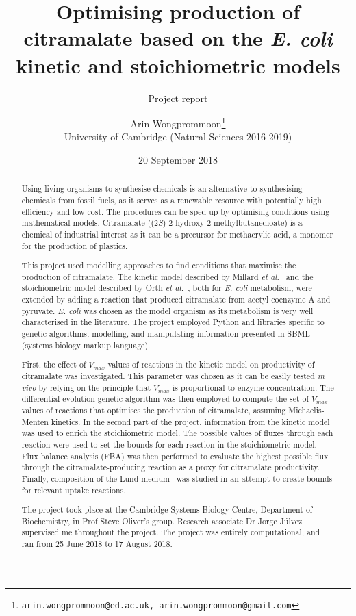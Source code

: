 \documentclass[parskip=full, numbers=noenddot]{scrreprt}
\author{Arin Wongprommoon\thanks{\texttt{arin.wongprommoon@ed.ac.uk, arin.wongprommoon@gmail.com}} \\University of Cambridge (Natural Sciences 2016-2019)}
\title{Optimising production of citramalate based on the \emph{E. coli} kinetic and stoichiometric models}
\subtitle{Project report}
\date{20 September 2018}
\begin{document}
\maketitle

\tableofcontents

\begin{abstract}
  Using living organisms to synthesise chemicals is an alternative to synthesising chemicals from fossil fuels, as it serves as a renewable resource with potentially high efficiency and low cost. The procedures can be sped up by optimising conditions using mathematical models. Citramalate ((2\emph{S})-2-hydroxy-2-methylbutanedioate) is a chemical of industrial interest as it can be a precursor for methacrylic acid, a monomer for the production of plastics. 
  
  This project used modelling approaches to find conditions that maximise the production of citramalate. The kinetic model described by Millard \emph{et al.}~\cite{millard_metabolic_2017} and the stoichiometric model described by Orth \emph{et al.}~\cite{orth_comprehensive_2011}, both for \emph{E. coli} metabolism, were extended by adding a reaction that produced citramalate from acetyl coenzyme A and pyruvate. \emph{E. coli} was chosen as the model organism as its metabolism is very well characterised in the literature. The project employed Python and libraries specific to genetic algorithms, modelling, and manipulating information presented in SBML (systems biology markup language).
  
  First, the effect of $V_{max}$ values of reactions in the kinetic model on productivity of citramalate was investigated. This parameter was chosen as it can be easily tested \emph{in vivo} by relying on the principle that $V_{max}$ is proportional to enzyme concentration. The differential evolution genetic algorithm was then employed to compute the set of $V_{max}$ values of reactions that optimises the production of citramalate, assuming Michaelis-Menten kinetics. In the second part of the project, information from the kinetic model was used to enrich the stoichiometric model. The possible values of fluxes through each reaction were used to set the bounds for each reaction in the stoichiometric model. Flux balance analysis (FBA) was then performed to evaluate the highest possible flux through the citramalate-producing reaction as a proxy for citramalate productivity. Finally, composition of the Lund medium~\cite{eastham_process_2015} was studied in an attempt to create bounds for relevant uptake reactions.
  
  The project took place at the Cambridge Systems Biology Centre, Department of Biochemistry, in Prof Steve Oliver's group. Research associate Dr Jorge J\'ulvez supervised me throughout the project. The project was entirely computational, and ran from 25 June 2018 to 17 August 2018.
\end{abstract}
\end{document}
